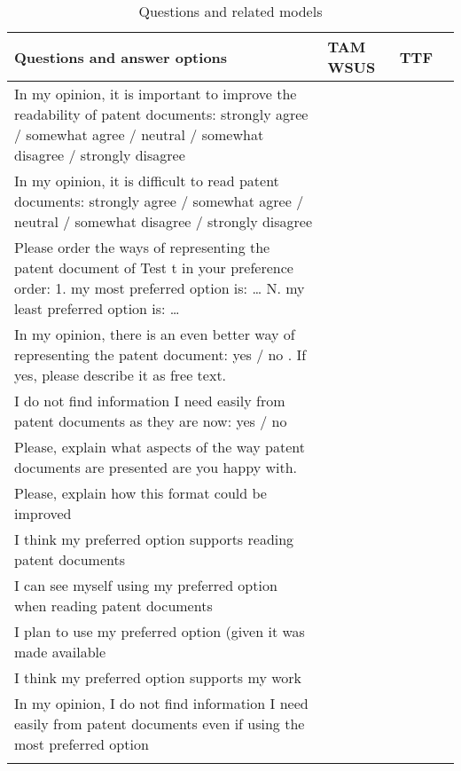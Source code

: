 \documentclass[11pt]{article}
\begin{document}
\begin{table}
\caption{Questions and related models}
\begin{small}
\begin{tabular}{p{10cm}lll}
\textbf{Questions and answer options} & \textbf{TAM WSUS} &  \textbf{TTF}  \\ \hline \hline
In my opinion, it is important to improve the readability of patent documents: strongly agree / somewhat agree / neutral / somewhat disagree / strongly disagree & & \\
In my opinion, it is difficult to read patent documents: strongly agree / somewhat agree / neutral / somewhat disagree / strongly disagree & & \\
Please order the ways of representing the patent document of Test t in your preference order: 1. my most preferred option is: … N. my least preferred option is: \ldots & & \\
In my opinion, there is an even better way of representing the patent document: yes / no . If yes, please describe it as free text. & & \\
I do not find information I need easily from patent documents as they are now:  yes / no & & \\
Please, explain what aspects of the way patent documents are presented are you happy with.  & & \\
Please, explain how this format could be improved  & & \\
I think my preferred option supports reading patent documents & & \\
I can see myself using my preferred option when reading patent documents & & \\
I plan to use my preferred option (given it was made available & & \\
I think my preferred option supports my work & & \\ 
In my opinion, I do not find information I need easily from patent documents even if using the most preferred option & & \\ \hline \hline
\label{Questions}
\end{tabular}
\end{small}
\end{table}
\end{document}
